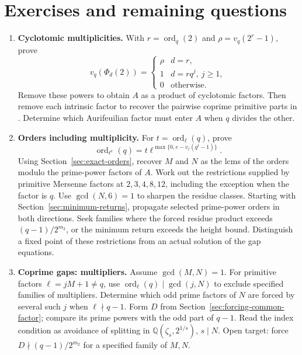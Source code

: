 \documentclass[11pt]{article}
\begin{document}
\section{Exercises and remaining questions}
\label{sec:exercises}
\begin{enumerate}
\item \textbf{Cyclotomic multiplicities.}
With $r=\operatorname{ord}_q(2)$ and $\rho=v_q(2^r-1)$, prove
\[
v_q(\Phi_d(2))=\begin{cases}
\rho&d=r,\\1&d=rq^j,\ j\geq1,\\0&\text{otherwise}.
\end{cases}
\]
Remove these powers to obtain $A$ as a product of cyclotomic factors.
Then remove each intrinsic factor to recover the pairwise coprime
primitive parts in \cite[\S2]{PomCycl}. Determine which Aurifeuilian
factor must enter $A$ when $q$ divides the other.

\item \textbf{Orders including multiplicity.}
For $t=\operatorname{ord}_\ell(q)$, prove
\[
\operatorname{ord}_{\ell^e}(q)
=t\ell^{\max\{0,e-v_\ell(q^t-1)\}}.
\]
Using Section~\ref{sec:exact-orders}, recover $M$ and $N$ as the lcms
of the orders modulo the prime-power factors of $A$.
Work out the restrictions supplied by primitive Mersenne factors at
$2,3,4,8,12$, including the exception when the factor is $q$.
Use $\gcd(N,6)=1$ to sharpen the residue classes. Starting with
Section~\ref{sec:minimum-returns}, propagate selected prime-power
orders in both directions. Seek families where the forced residue
product exceeds $(q-1)/2^{m_2}$, or the minimum return exceeds the
height bound. Distinguish a fixed point of these restrictions from
an actual solution of the gap equations.

\item \textbf{Coprime gaps: multipliers.}
Assume $\gcd(M,N)=1$. For primitive factors $\ell=jM+1\neq q$,
use $\operatorname{ord}_\ell(q)\mid\gcd(j,N)$ to exclude specified
families of multipliers. Determine which odd prime factors of $N$
are forced by several such $j$ when $\ell\nmid q-1$.
Form $D$ from Section~\ref{sec:forcing-common-factor}; compare its
prime powers with the odd part of $q-1$. Read the index condition
as avoidance of splitting in $\mathbb Q(\zeta_s,2^{1/s})$, $s\mid N$.
Open target: force $D\nmid(q-1)/2^{m_2}$ for a specified family of $M,N$.


\end{enumerate}
\end{document}
